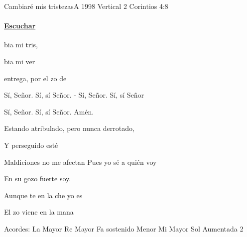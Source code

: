 \documentclass[12pt, spanish]{book}
\newcommand{\NotCCLIed}{\relax}
\begin{document}
    \begin{song}{Cambiaré mis tristezas}{A}
    {1998} %
    {Vertical}
    {2 Corintios 4:8} %
    {} %
        \ifChordBk
            \paragraph{\mbox{}\hfill\protect\href{https://open.spotify.com/intl-es/track/5LNJcv7ynGZkROBrP7C8Is}{Escuchar}\mbox{}\hfill}
        \fi

        \begin{SBOpGroup}
            bia mi tris,

            bia mi ver

             entrega,  por el zo de 
        \end{SBOpGroup}

        \begin{SBOpGroup}
            Sí, Señor. Sí, sí Señor. - Sí, Señor. Sí, sí Señor

            Sí, Señor. Sí, sí Señor. Amén.
        \end{SBOpGroup}

        \begin{SBOpGroup}
            Estando atribulado, pero nunca derrotado,

            Y perseguido esté

            Maldiciones no me afectan Pues yo sé a quién voy

            En su gozo fuerte soy.
        \end{SBOpGroup}

        \begin{SBOpGroup}
            Aunque te en la che yo es

            El zo viene en la mana
        \end{SBOpGroup}

        \ifChordBk
        \begin{SBOpGroup}
            Acordes:\break
            \upchord{\A}\qquad La Mayor \hfill
            \upchord{\D}\qquad Re Mayor \hfill\null\break
            \upchord{\Fsm}\qquad Fa sostenido Menor \hfill
            \upchord{\E}\qquad Mi Mayor \hfill\null\break
            \upchord{\Gtwo}\qquad Sol Aumentada 2 \hfill\null\break
        \end{SBOpGroup}
        \fi
    \end{song}
\end{document}
